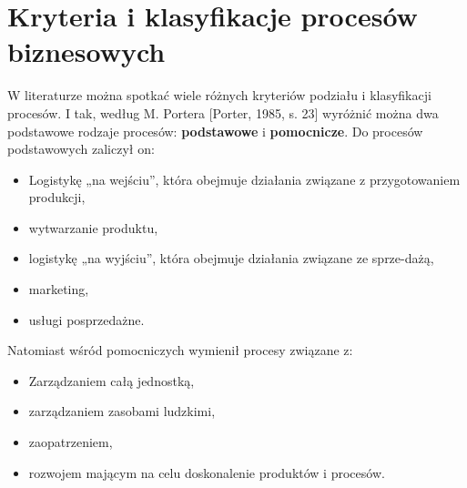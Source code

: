 \documentclass[a4paper, 12pt]{article}
\begin{document}
\section{Kryteria i klasyfikacje procesów biznesowych}
\hspace*{1.5 cm}W literaturze  można  spotkać  wiele  różnych  kryteriów  podziału  i klasyfikacji  procesów.  I  tak,  według  M.  Portera  [Porter,  1985,  s.  23]  wyróżnić  można  dwa  podstawowe  rodzaje  procesów:  \textbf{podstawowe}  i  \textbf{pomocnicze}. Do procesów podstawowych zaliczył on: 
\begin{itemize}
	\item Logistykę „na wejściu”, która obejmuje działania związane z przygotowaniem produkcji,
	\item wytwarzanie produktu, 
 	\item logistykę  „na  wyjściu”,  która obejmuje  działania związane ze sprze-dażą,
	\item marketing,
	\item usługi posprzedażne.
\end{itemize}

\hspace*{1.5 cm}Natomiast wśród pomocniczych wymienił procesy związane z: 
\begin{itemize}
	\item Zarządzaniem całą jednostką,
	\item zarządzaniem zasobami ludzkimi,
	\item zaopatrzeniem,
	\item rozwojem mającym na celu doskonalenie produktów i procesów.
\end{itemize}
\end{document}

